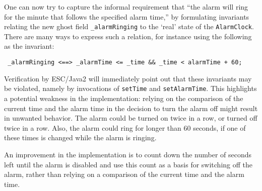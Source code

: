 \documentclass{llncs}
\begin{document}
One can now try to capture the informal requirement that 
``the alarm will ring for the minute that follows 
the specified alarm time,'' by formulating 
invariants relating the new ghost field \texttt{\_alarmRinging} to
the `real' state of the \texttt{AlarmClock}. There are many ways to express
such a relation, for instance using the following as the invariant:
\begin{verbatim}
 _alarmRinging <==> _alarmTime <= _time && _time < alarmTime + 60;
\end{verbatim}
%
Verification by ESC/Java2 will immediately point out that these invariants
may be violated,
namely by invocations of \texttt{setTime} and  \texttt{setAlarmTime}.
This highlights a potential weakness in the implementation:
relying on the comparison of the current time and the alarm time
in the decision to turn the alarm off might result in unwanted behavior. 
The alarm could be turned on twice in a row, or turned off twice in a row.
Also, the alarm could ring for longer than 60 seconds, if one of these times 
is changed while the alarm is ringing.


An improvement in the implementation is to count down the number of 
seconds left until the alarm is disabled and use this count as a basis for switching 
off the alarm, rather than relying on a comparison of the current time 
and the alarm time.
\end{document}
